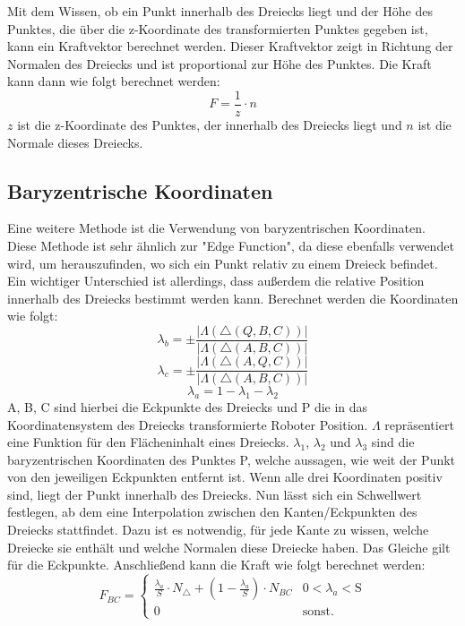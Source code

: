 \documentclass[conference]{IEEEtran}
\begin{document}
Mit dem Wissen, ob ein Punkt innerhalb des Dreiecks liegt und der Höhe des Punktes, die über die z-Koordinate des transformierten Punktes gegeben ist, kann ein Kraftvektor berechnet werden. Dieser Kraftvektor zeigt in Richtung der Normalen des Dreiecks und ist proportional zur Höhe des Punktes. Die Kraft kann dann wie folgt berechnet werden:
\begin{equation}
    F = \frac{1}{z} \cdot n
\end{equation}
$z$ ist die z-Koordinate des Punktes, der innerhalb des Dreiecks liegt und $n$ ist die Normale dieses Dreiecks.

\subsection{Baryzentrische Koordinaten} \label{bary}
Eine weitere Methode ist die Verwendung von baryzentrischen Koordinaten. Diese Methode ist sehr ähnlich zur "Edge Function", da diese ebenfalls verwendet wird, um herauszufinden, wo sich ein Punkt relativ zu einem Dreieck befindet. Ein wichtiger Unterschied ist allerdings, dass außerdem die relative Position innerhalb des Dreiecks bestimmt werden kann. Berechnet werden die Koordinaten wie folgt:
\begin{equation*}
    \lambda_b = \pm\frac{|\Lambda(\triangle(Q,B,C))|}{|\Lambda(\triangle(A,B,C))|}
\end{equation*}
\begin{equation}
    \lambda_c = \pm\frac{|\Lambda(\triangle(A,Q,C))|}{|\Lambda(\triangle(A,B,C))|}
\end{equation}
\begin{equation*}
    \lambda_a = 1 - \lambda_1 - \lambda_2
\end{equation*}
A, B, C sind hierbei die Eckpunkte des Dreiecks und P die in das Koordinatensystem des Dreiecks transformierte Roboter Position. $\Lambda$ repräsentiert eine Funktion für den Flächeninhalt eines Dreiecks. $\lambda_1$, $\lambda_2$ und $\lambda_3$ sind die baryzentrischen Koordinaten des Punktes P, welche aussagen, wie weit der Punkt von den jeweiligen Eckpunkten entfernt ist. Wenn alle drei Koordinaten positiv sind, liegt der Punkt innerhalb des Dreiecks. Nun lässt sich ein Schwellwert festlegen, ab dem eine Interpolation zwischen den Kanten/Eckpunkten des Dreiecks stattfindet. Dazu ist es notwendig, für jede Kante zu wissen, welche Dreiecke sie enthält und welche Normalen diese Dreiecke haben. Das Gleiche gilt für die Eckpunkte. Anschließend kann die Kraft wie folgt berechnet werden:
\begin{equation*}
    F_{BC} = 
    \begin{cases} 
        \frac{\lambda_a}{S}\cdot N_{\triangle} + (1-\frac{\lambda_a}{S})\cdot N_{BC} &  0 < \lambda_a < \text{S} \\
        0 & \text{sonst.}
    \end{cases}
\end{equation*}
\end{document}
